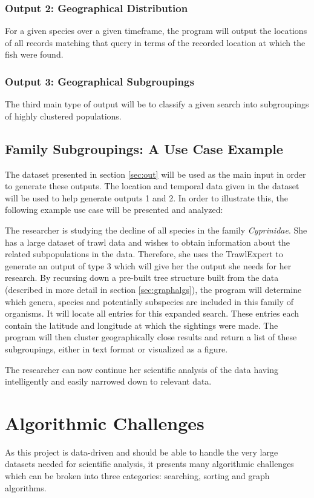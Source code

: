 \documentclass{article}
\begin{document}
\subsubsection{Output 2: Geographical Distribution}
For a given species over a given timeframe, the program will output the locations of all records matching that query in terms of the recorded location at which the fish were found.

\subsubsection{Output 3: Geographical Subgroupings}\label{sec:subgroup}
The third main type of output will be to classify a given search into subgroupings of highly clustered populations.

\subsection{Family Subgroupings: A Use Case Example}\label{sec:case}
The dataset presented in section \ref{sec:out} will be used as the main input in order to generate these outputs. The location and temporal data given in the dataset will be used to help generate outputs 1 and 2. In order to illustrate this, the following example use case will be presented and analyzed:

The researcher is studying the decline of all species in the family \textit{Cyprinidae}. She has a large dataset of trawl data and wishes to obtain information about the related subpopulations in the data. Therefore, she uses the TrawlExpert to generate an output of type 3 which will give her the output she needs for her research. By recursing down a pre-built tree structure built from the data (described in more detail in section \ref{sec:graphalgs}), the program will determine which genera, species and potentially subspecies are included in this family of organisms. It will locate all entries for this expanded search. These entries each contain the latitude and longitude at which the sightings were made. The program will then cluster geographically close results and return a list of these subgroupings, either in text format or visualized as a figure.

The researcher can now continue her scientific analysis of the data having intelligently and easily narrowed down to relevant data.

\section{Algorithmic Challenges}
As this project is data-driven and should be able to handle the very large datasets needed for scientific analysis, it presents many algorithmic challenges which can be broken into three categories: searching, sorting and graph algorithms.
\end{document}
